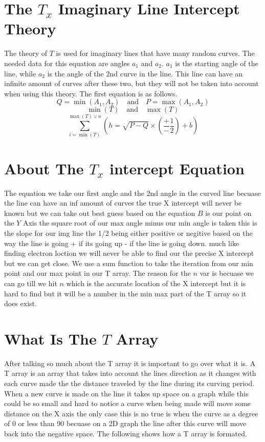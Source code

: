 \documentclass{article}
\begin{document}
\section{The \(T_x\) Imaginary Line Intercept Theory}
The theory of \(T\) is used for imaginary lines that have many random curves. The needed data for this equation are angles \(a_1\) and \(a_2\). \(a_1\) is the starting angle of the line, while \(a_2\) is the angle of the 2nd curve in the line. This line can have an infinite amount of curves after these two, but they will not be taken into account when using this theory. The first equation is as follows.
\[
Q = \min(A_1, A_2) \quad \text{and} \quad P = \max(A_1, A_2)
\]
\[
\min(T) \quad \text{and} \quad \max(T)
\]
\[
\sum_{i=\min(T)}^{\max(T) \vee n} \left( h = \sqrt{P - Q} \times \left( \frac{+}{-} \frac{1}{2} \right) + b \right)
\]

\section{About The \(T_x\) intercept Equation}
The equation we take our first angle and the 2nd angle in the curved line becuase the line can have an inf amount of curves the true X intercept will never be known but we can take out best guess based on the equation \(B\) is our point on the \(Y\) Axis the square root of our max angle minus our min angle is taken this is the slope for our img line the 1/2 being either positive or negitive based on the way the line is going + if its going up - if the line is going down. much like finding electron loction we will never be able to find our the precise X intercept but we can get close. We use a sum function to take the iteration from our min point and our max point in our T array. The reason for the \(n\) var is becuase we can go till we hit \(n\) which is the accurate location of the X intercept but it is hard to find but it will be a number in the min max part of the T array so it does exist. 
\section{What Is The \(T\) Array}

After talking so much about the T array it is important to go over what it is. A T array is an array that takes into account the lines direction as it changes with each curve made the the distance traveled by the line during its curving period. When a new curve is made on the line it takes up space on a graph while this could be so small and hard to notice a curve when being made will move some distance on the X axis the only case this is no true is when the curve as a degree of 0 or less than 90 becuase on a 2D graph the line after this curve will move back into the negative space. The following shows how a T array is formated.
\end{document}
